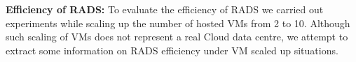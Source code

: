 \textbf{Efficiency of RADS:}
To evaluate the efficiency of RADS we carried out experiments while scaling up the number of hosted VMs from 2 to 10. Although such scaling of VMs does not represent a real Cloud data centre, we attempt to extract some information on RADS efficiency under VM scaled up situations. 

